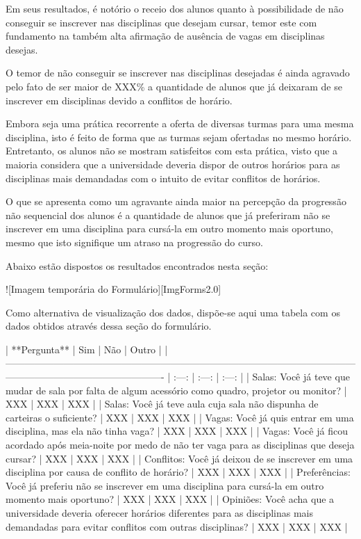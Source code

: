 Em seus resultados, é notório o receio dos alunos quanto à possibilidade de não conseguir se inscrever nas disciplinas que desejam cursar, temor este com fundamento na também alta afirmação de ausência de vagas em disciplinas desejas.

O temor de não conseguir se inscrever nas disciplinas desejadas é ainda agravado pelo fato de ser maior de XXX\% a quantidade de alunos que já deixaram de se inscrever em disciplinas devido a conflitos de horário.

Embora seja uma prática recorrente a oferta de diversas turmas para uma mesma disciplina, isto é feito de forma que as turmas sejam ofertadas no mesmo horário. Entretanto, os alunos não se mostram satisfeitos com esta prática, visto que a maioria considera que a universidade deveria dispor de outros horários para as disciplinas mais demandadas com o intuito de evitar conflitos de horários.

O que se apresenta como um agravante ainda maior na percepção da progressão não sequencial dos alunos é a quantidade de alunos que já preferiram não se inscrever em uma disciplina para cursá-la em outro momento mais oportuno, mesmo que isto signifique um atraso na progressão do curso.

Abaixo estão dispostos os resultados encontrados nesta seção:

![Imagem temporária do Formulário][ImgForms2.0]

Como alternativa de visualização dos dados, dispõe-se aqui uma tabela com os dados obtidos através dessa seção do formulário.

| **Pergunta**                                                                                                                                                  |  Sim  |  Não  | Outro |
| ------------------------------------------------------------------------------------------------------------------------------------------------------------- | :---: | :---: | :---: |
| Salas: Você já teve que mudar de sala por falta de algum acessório como quadro, projetor ou monitor?                                                          |  XXX  |  XXX  |  XXX  |
| Salas: Você já teve aula cuja sala não dispunha de carteiras o suficiente?                                                                                    |  XXX  |  XXX  |  XXX  |
| Vagas: Você já quis entrar em uma disciplina, mas ela não tinha vaga?                                                                                         |  XXX  |  XXX  |  XXX  |
| Vagas: Você já ficou acordado após meia-noite por medo de não ter vaga para as disciplinas que deseja cursar?                                                 |  XXX  |  XXX  |  XXX  |
| Conflitos: Você já deixou de se inscrever em uma disciplina por causa de conflito de horário?                                                                 |  XXX  |  XXX  |  XXX  |
| Preferências: Você já preferiu não se inscrever em uma disciplina para cursá-la em outro momento mais oportuno?                                               |  XXX  |  XXX  |  XXX  |
| Opiniões: Você acha que a universidade deveria oferecer horários diferentes para as disciplinas mais demandadas para evitar conflitos com outras disciplinas? |  XXX  |  XXX  |  XXX  |

